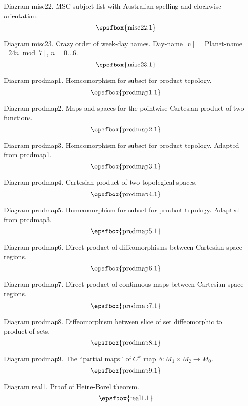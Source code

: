 \filleject

Diagram misc22. MSC subject list with Australian spelling and clockwise
orientation.
$$
\centerline{\epsfbox{misc22.1}}
$$

Diagram misc23. Crazy order of week-day names.
Day-name$[n]={}$Planet-name$[24n\bmod 7]$, $n=0\dots6$.
$$
\centerline{\epsfbox{misc23.1}}
$$

\secteject
\edef\SECTprodmap{\the\pageno}

Diagram prodmap1. Homeomorphism for subset for product topology.
$$
\centerline{\epsfbox{prodmap1.1}}
$$

Diagram prodmap2. Maps and spaces for the pointwise Cartesian product of two
functions.
$$
\centerline{\epsfbox{prodmap2.1}}
$$

Diagram prodmap3. Homeomorphism for subset for product topology. Adapted from
prodmap1.
$$
\centerline{\epsfbox{prodmap3.1}}
$$

Diagram prodmap4. Cartesian product of two topological spaces.
$$
\centerline{\epsfbox{prodmap4.1}}
$$

\filleject

Diagram prodmap5. Homeomorphism for subset for product topology. Adapted from
prodmap3.
$$
\centerline{\epsfbox{prodmap5.1}}
$$

Diagram prodmap6. Direct product of diffeomorphisms between Cartesian space
regions.
$$
\centerline{\epsfbox{prodmap6.1}}
$$

Diagram prodmap7. Direct product of continuous maps between Cartesian space
regions.
$$
\centerline{\epsfbox{prodmap7.1}}
$$

\filleject

Diagram prodmap8. Diffeomorphism between slice of set diffeomorphic to product
of sets.
$$
\centerline{\epsfbox{prodmap8.1}}
$$

Diagram prodmap9. The ``partial maps'' of $C^k$ map $\phi:M_1\times M_2\to M_0$.
$$
\centerline{\epsfbox{prodmap9.1}}
$$

\secteject
\edef\SECTreal{\the\pageno}

Diagram real1. Proof of Heine-Borel theorem.
$$
\centerline{\epsfbox{real1.1}}
$$

